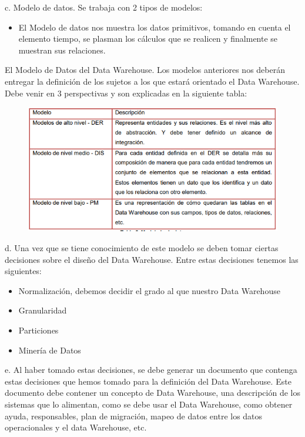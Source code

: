 \documentclass[preprint,12pt]{elsarticle}
\begin{document}
	c. Modelo de datos. Se trabaja con 2 tipos de modelos:
		\begin{itemize}
			\item El Modelo de datos nos muestra los datos primitivos, tomando en cuenta el elemento tiempo, se plasman los cálculos que se realicen y finalmente se muestran sus relaciones.
		\end{itemize}


El Modelo de Datos del Data Warehouse. Los modelos anteriores nos deberán entregar la definición de los sujetos a los que estará orientado el Data Warehouse. Debe venir en 3 perspectivas y son explicadas en la siguiente tabla:
\begin{figure}[htb]

			\begin{center}
					\includegraphics[width=15cm]{./IMAGENES/imgmire3}
				\end{center}
			\end{figure}

	d. Una vez que se tiene conocimiento de este modelo se deben tomar ciertas decisiones sobre el diseño del Data Warehouse. Entre estas decisiones tenemos las siguientes:
		\begin{itemize}
			\item Normalización, debemos decidir el grado al que nuestro Data Warehouse
			\item Granularidad
			\item Particiones
			\item  Minería de Datos
		\end{itemize}

	e. Al haber tomado estas decisiones, se debe generar un documento que contenga estas decisiones que hemos tomado para la definición del Data Warehouse. Este documento debe contener un concepto de Data Warehouse, una descripción de los sistemas que lo alimentan, como se debe usar el Data Warehouse, como obtener ayuda, responsables, plan de migración, mapeo de datos entre los datos operacionales y el data Warehouse, etc.
\end{document}
